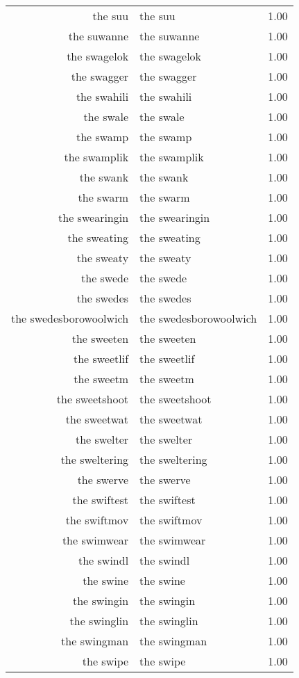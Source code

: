 \begin{table}[ht]
\begin{tabular}{rlr}
  the suu & the suu & 1.00 \\ 
  the suwanne & the suwanne & 1.00 \\ 
  the swagelok & the swagelok & 1.00 \\ 
  the swagger & the swagger & 1.00 \\ 
  the swahili & the swahili & 1.00 \\ 
  the swale & the swale & 1.00 \\ 
  the swamp & the swamp & 1.00 \\ 
  the swamplik & the swamplik & 1.00 \\ 
  the swank & the swank & 1.00 \\ 
  the swarm & the swarm & 1.00 \\ 
  the swearingin & the swearingin & 1.00 \\ 
  the sweating & the sweating & 1.00 \\ 
  the sweaty & the sweaty & 1.00 \\ 
  the swede & the swede & 1.00 \\ 
  the swedes & the swedes & 1.00 \\ 
  the swedesborowoolwich & the swedesborowoolwich & 1.00 \\ 
  the sweeten & the sweeten & 1.00 \\ 
  the sweetlif & the sweetlif & 1.00 \\ 
  the sweetm & the sweetm & 1.00 \\ 
  the sweetshoot & the sweetshoot & 1.00 \\ 
  the sweetwat & the sweetwat & 1.00 \\ 
  the swelter & the swelter & 1.00 \\ 
  the sweltering & the sweltering & 1.00 \\ 
  the swerve & the swerve & 1.00 \\ 
  the swiftest & the swiftest & 1.00 \\ 
  the swiftmov & the swiftmov & 1.00 \\ 
  the swimwear & the swimwear & 1.00 \\ 
  the swindl & the swindl & 1.00 \\ 
  the swine & the swine & 1.00 \\ 
  the swingin & the swingin & 1.00 \\ 
  the swinglin & the swinglin & 1.00 \\ 
  the swingman & the swingman & 1.00 \\ 
  the swipe & the swipe & 1.00 \\ 

\end{tabular}
\end{table}
